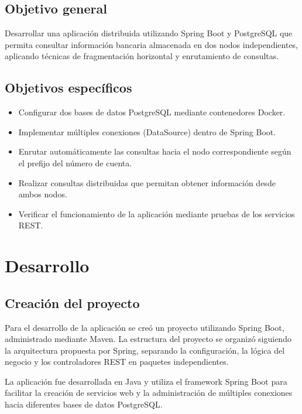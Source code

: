 \documentclass[11pt,a4paper]{article}
\begin{document}
\subsection*{Objetivo general}

Desarrollar una aplicación distribuida utilizando Spring Boot y PostgreSQL que permita consultar información bancaria almacenada en dos nodos independientes, aplicando técnicas de fragmentación horizontal y enrutamiento de consultas.

\subsection*{Objetivos específicos}

\begin{itemize}[leftmargin=*]
    \item Configurar dos bases de datos PostgreSQL mediante contenedores Docker.
    \item Implementar múltiples conexiones (DataSource) dentro de Spring Boot.
    \item Enrutar automáticamente las consultas hacia el nodo correspondiente según el prefijo del número de cuenta.
    \item Realizar consultas distribuidas que permitan obtener información desde ambos nodos.
    \item Verificar el funcionamiento de la aplicación mediante pruebas de los servicios REST.
\end{itemize}

\FloatBarrier
\section{Desarrollo}

\FloatBarrier
\subsection{Creación del proyecto}

Para el desarrollo de la aplicación se creó un proyecto utilizando Spring Boot, administrado mediante Maven. La estructura del proyecto se organizó siguiendo la arquitectura propuesta por Spring, separando la configuración, la lógica del negocio y los controladores REST en paquetes independientes.

La aplicación fue desarrollada en Java y utiliza el framework Spring Boot para facilitar la creación de servicios web y la administración de múltiples conexiones hacia diferentes bases de datos PostgreSQL.
\end{document}
